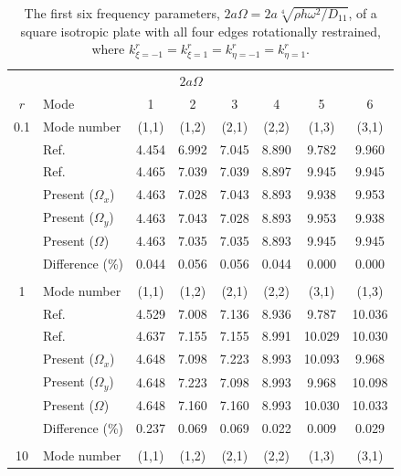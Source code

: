 \documentclass[preprint,12pt]{elsarticle}
\begin{document}
\begin{table}[!htbp]
	\centering
	\caption{The first six frequency parameters, \(2a\Omega = 2a\sqrt[4]{\rho h \omega^2/D_{11}}\), of a square isotropic plate with all four edges rotationally restrained, where \(k^r_{\xi=-1} = k^r_{\xi=1} = k^r_{\eta=-1} = k^r_{\eta=1}\).}  
	\begin{tabular}{c l c c c c c c}
		\toprule
		\multicolumn{1}{c}{} & \multicolumn{6}{c}{$2a\Omega$} \\ 
		\cmidrule(lr){3-8}
		$r$ & Mode & 1 & 2 & 3 & 4 & 5 & 6 \\ 
		\midrule
		0.1 & Mode number   & (1,1) & (1,2) & (2,1) & (2,2) & (1,3) & (3,1) \\
		& Ref.\Citealp{mukhopadhyay1979free} & 4.454 & 6.992 & 7.045 & 8.890  & 9.782  & 9.960 \\
		& Ref.\Citealp{zhang2019new} & 4.465 & 7.039 & 7.039 &8.897  &9.945& 9.945 \\
		& Present ($\Omega_x$)   & 4.463     & 7.028     & 7.043     & 8.893     & 9.938       & 9.953  \\
		& Present ($\Omega_y$)   & 4.463    &7.043     &  7.028       & 8.893   &  9.953    & 9.938 \\ 
		& Present ($\Omega$)   & 4.463    & 7.035     & 7.035      &8.893     & 9.945     & 9.945   \\
		&Difference (\%)& 0.044     & 0.056      & 0.056      & 0.044     &  0.000     & 0.000
		\\
		\\
		1 & Mode number   &  (1,1) & (1,2) & (2,1) & (2,2) & (3,1) & (1,3) \\
		& Ref.\Citealp{mukhopadhyay1979free} & 4.529& 7.008 &7.136 &8.936& 9.787& 10.036 \\
		& Ref.\Citealp{zhang2019new} & 4.637 &7.155 & 7.155 & 8.991 & 10.029 & 10.030 \\
		& Present ($\Omega_x$)   & 4.648     & 7.098      &7.223     & 8.993     &   10.093    & 9.968  \\
		& Present ($\Omega_y$)   & 4.648     & 7.223     & 7.098       & 8.993     &   9.968     & 10.098
		\\ 
		& Present ($\Omega$)   & 4.648      & 7.160   & 7.160     & 8.993    &   10.030   & 10.033   \\
		&Difference (\%)& 0.237    & 0.069      & 0.069      & 0.022     &  0.009     &0.029
		\\
		\\
		10 & Mode number   &  (1,1) & (1,2) & (2,1) & (2,2) & (1,3) & (3,1) \\

\end{tabular}
\end{table}
\end{document}
